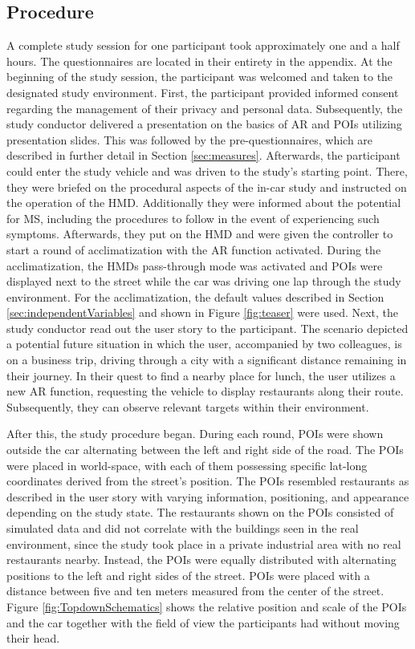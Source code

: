 \subsection{Procedure}
\label{sec:procedure}
A complete study session for one participant took approximately one and a half hours. The questionnaires are located in their entirety in the appendix. At the beginning of the study session, the participant was welcomed and taken to the designated study environment. First, the participant provided informed consent regarding the management of their privacy and personal data. Subsequently, the study conductor delivered a presentation on the basics of AR and POIs utilizing presentation slides. This was followed by the pre-questionnaires, which are described in further detail in Section \ref{sec:measures}. Afterwards, the participant could enter the study vehicle and was driven to the study's starting point. There, they were briefed on the procedural aspects of the in-car study and instructed on the operation of the HMD. Additionally they were informed about the potential for MS, including the procedures to follow in the event of experiencing such symptoms. Afterwards, they put on the HMD and were given the controller to start a round of acclimatization with the AR function activated. During the acclimatization, the HMDs pass-through mode was activated and POIs were displayed next to the street while the car was driving one lap through the study environment. For the acclimatization, the default values described in Section \ref{sec:independentVariables} and shown in Figure \ref{fig:teaser} were used. Next, the study conductor read out the user story to the participant. The scenario depicted a potential future situation in which the user, accompanied by two colleagues, is on a business trip, driving through a city with a significant distance remaining in their journey. In their quest to find a nearby place for lunch, the user utilizes a new AR function, requesting the vehicle to display restaurants along their route. Subsequently, they can observe relevant targets within their environment.

After this, the study procedure began. During each round, POIs were shown outside the car alternating between the left and right side of the road. The POIs were placed in world-space, with each of them possessing specific lat-long coordinates derived from the street's position. The POIs resembled restaurants as described in the user story with varying information, positioning, and appearance depending on the study state. The restaurants shown on the POIs consisted of simulated data and did not correlate with the buildings seen in the real environment, since the study took place in a private industrial area with no real restaurants nearby. Instead, the POIs were equally distributed with alternating positions to the left and right sides of the street. POIs were placed with a distance between five and ten meters measured from the center of the street. Figure \ref{fig:TopdownSchematics} shows the relative position and scale of the POIs and the car together with the field of view the participants had without moving their head.




